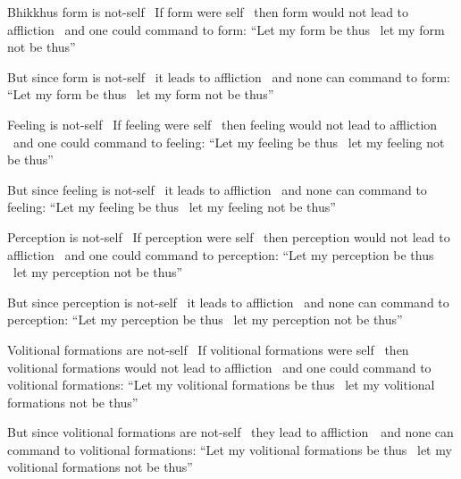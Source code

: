 \begin{english-only-hang}
  Bhikkhus form is not-self \breathmark\ If form were self \breathmark\ then form would not lead to affliction \breathmark\ and one could command to form: ``Let my form be thus \breathmark\ let my form not be thus''
\end{english-only-hang}
\begin{english-only-hang-together}
  But since form is not-self \breathmark\ it leads to affliction \breathmark\ and none can command to form: ``Let my form be thus \breathmark\ let my form not be thus''
\end{english-only-hang-together}

\begin{english-only-hang}
  Feeling is not-self \breathmark\ If feeling were self \breathmark\ then feeling would not lead to affliction \breathmark\ and one could command to feeling: ``Let my feeling be thus \breathmark\ let my feeling not be thus''
\end{english-only-hang}
\begin{english-only-hang-together}
  But since feeling is not-self \breathmark\ it leads to affliction \breathmark\ and none can command to feeling: ``Let my feeling be thus \breathmark\ let my feeling not be thus''
\end{english-only-hang-together}

\ifninebythirteen\clearpage\fi

\begin{english-only-hang}
  Perception is not-self \breathmark\ If perception were self \breathmark\ then perception would not lead to affliction \breathmark\ and one could command to perception: ``Let my perception be thus \breathmark\ let my perception not be thus''
\end{english-only-hang}
\begin{english-only-hang-together}
  But since perception is not-self \breathmark\ it leads to affliction \breathmark\ and none can command to perception: ``Let my perception be thus \breathmark\ let my perception not be thus''
\end{english-only-hang-together}

\ifbfive\clearpage\fi
\ifafive\clearpage\fi

\begin{english-only-hang}
  Volitional formations are not-self \breathmark\ If volitional formations were self \breathmark\ then volitional formations would not lead to affliction \breathmark\ and one could command to volitional formations: ``Let my volitional formations be thus \breathmark\ let my volitional formations not be thus''
\end{english-only-hang}
\begin{english-only-hang-together}
  But since volitional formations are not-self \breathmark\ they lead to \mbox{affliction}~\breathmark\ and none can command to volitional formations: ``Let my volitional formations be thus \breathmark\ let my volitional formations not be thus''
\end{english-only-hang-together}


